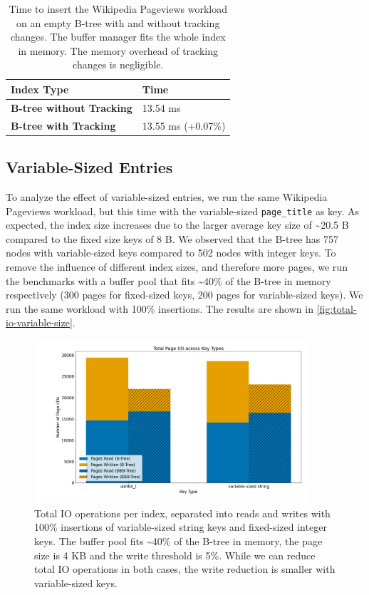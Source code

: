 \begin{table}[ht]
\centering
\begin{tabular}{l|l}
\toprule
\textbf{Index Type} & Time \\
\midrule
\textbf{B-tree without Tracking}  & 13.54 ms \\
\textbf{B-tree with Tracking}  & 13.55 ms (+0.07\%) \\
\bottomrule
\end{tabular}
\caption{Time to insert the Wikipedia Pageviews workload on an empty B-tree with and without tracking changes. The buffer manager fits the whole index in memory. The memory overhead of tracking changes is negligible.}
\label{tab:tracking-overhead}
\end{table}

\subsection{Variable-Sized Entries}
\label{sec:variable-sized-entries}
To analyze the effect of variable-sized entries, we run the same Wikipedia Pageviews workload, but this time with the variable-sized \texttt{page\_title} as key.
As expected, the index size increases due to the larger average key size of \textasciitilde 20.5 B compared to the fixed size keys of 8 B.
We observed that the B-tree has 757 nodes with variable-sized keys compared to 502 nodes with integer keys.
To remove the influence of different index sizes, and therefore more pages, we run the benchmarks with a buffer pool that fits \textasciitilde40\% of the B-tree in memory respectively (300 pages for fixed-sized keys, 200 pages for variable-sized keys).
We run the same workload with 100\% insertions.
The results are shown in \autoref{fig:total-io-variable-size}.

\begin{figure}[htbp]
  \centering
  \includegraphics[width=0.9\textwidth]{figures/evaluation/pageviews_total_io_variable_size.png}
  \caption{Total \ac{IO} operations per index, separated into reads and writes with 100\% insertions of variable-sized string keys and fixed-sized integer keys. The buffer pool fits \textasciitilde40\% of the B-tree in memory, the page size is 4 KB and the write threshold is 5\%. While we can reduce total \ac{IO} operations in both cases, the write reduction is smaller with variable-sized keys.}
  \label{fig:total-io-variable-size}
\end{figure}

